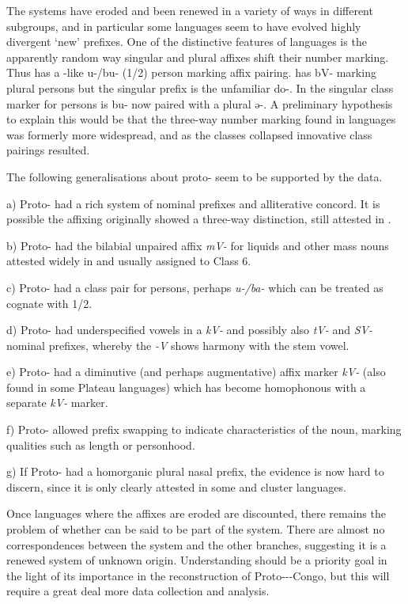 \documentclass[output=paper]{langsci/langscibook}
\begin{document}
The systems have eroded and been renewed in a variety of ways in different subgroups, and in particular some languages seem to have evolved highly divergent ‘new’ prefixes. One of the distinctive features of  languages is the apparently random way singular and plural affixes shift their number marking. Thus  has a -like u-/bu- (1/2) person marking affix pairing.  has bV- marking plural persons but the singular prefix is the unfamiliar do-. In  the singular class marker for persons is bu- now paired with a plural ə-. A preliminary hypothesis to explain this would be that the three-way number marking found in  languages was formerly more widespread, and as the classes collapsed innovative class pairings resulted.

The following generalisations about proto- seem to be supported by the data.

a) Proto- had a rich system of nominal prefixes and alliterative concord. It is possible the affixing originally showed a three-way distinction, still attested in .

b) Proto- had the bilabial unpaired affix \textit{mV-} for liquids and other mass nouns attested widely in  and usually assigned to Class 6.

c) Proto- had a class pair for persons, perhaps \textit{u-/ba-} which can be treated as cognate with  1/2.

d) Proto- had underspecified vowels in a \textit{kV-} and possibly also \textit{tV-} and \textit{SV-} nominal prefixes, whereby the \textit{{}-V} shows harmony with the stem vowel.

e) Proto- had a diminutive (and perhaps augmentative) affix marker \textit{kV-} (also found in some Plateau languages) which has become homophonous with a separate \textit{kV-} marker.

f) Proto- allowed prefix swapping to indicate characteristics of the noun, marking qualities such as length or personhood.

g) If Proto- had a homorganic plural nasal prefix, the evidence is now hard to discern, since it is only clearly attested in some   and  cluster languages.

Once languages where the affixes are eroded are discounted, there remains the problem of whether  can be said to be part of the system. There are almost no correspondences between the  system and the other branches, suggesting it is a renewed system of unknown origin. Understanding  should be a priority goal in the light of its importance in the reconstruction of Proto---Congo, but this will require a great deal more data collection and analysis.
\end{document}
